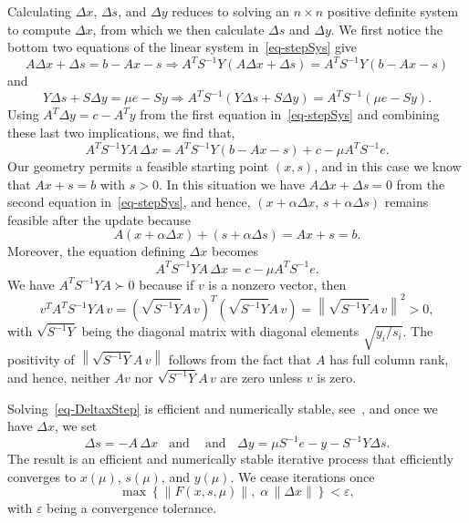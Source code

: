 \documentclass{article}
\def\pd{\succ}
\begin{document}
Calculating $\Delta x$, $\Delta s$, and $\Delta y$ reduces to solving
an $n \times n$ positive definite system to compute $\Delta x$, from
which we then calculate $\Delta s$ and $\Delta y$.
We first notice the bottom two equations of the linear 
system in~\eqref{eq-stepSys} give
\[
A \Delta x + \Delta s = b - Ax - s
   \Rightarrow A^TS^{-1}Y \left( A \Delta x + \Delta s \right)
                    = A^T S^{-1}Y \left( b - Ax - s \right)
\]
and
\[
Y \Delta s + S \Delta y = \mu e - Sy
   \Rightarrow A^TS^{-1} \left(Y \Delta s + S \Delta y \right)
                    = A^TS^{-1} \left( \mu e - Sy \right). 
\]
Using $A^T \Delta y = c - A^Ty$ from the first equation
in~\eqref{eq-stepSys} and combining these last two implications, we 
find that,
\[
A^T S^{-1}YA \, \Delta x = A^T S^{-1} Y \left( b - Ax - s \right)
    + c - \mu A^T S^{-1} e.
\]
Our geometry permits a feasible starting point $(x,s)$, and
in this case we know that $Ax + s = b$ with $s > 0$. In this situation
we have $A \Delta x + \Delta s = 0$ from the second equation 
in~\eqref{eq-stepSys}, and hence,
$(x + \alpha \Delta x, \, s + \alpha \Delta s)$ remains feasible
after the update because
\[
A (x + \alpha \Delta x) + (s + \alpha \Delta s)
    = Ax + s = b.
\]
Moreover, the equation defining $\Delta x$ becomes
\begin{equation} \label{eq-DeltaxStep}
A^T S^{-1}YA \, \Delta x = c - \mu A^T S^{-1} e.
\end{equation}
We have $A^T S^{-1} YA \pd 0$ because if $v$ is a nonzero vector, then
\[
v^T A^T S^{-1} YA \, v = (\sqrt{S^{-1}Y}A\,v)^T(\sqrt{S^{-1}Y}A\,v)
    = \left\| \sqrt{S^{-1}Y}A \, v \right\|^2 > 0,
\]
with $\sqrt{S^{-1}Y}$ being the diagonal matrix with diagonal elements 
$\sqrt{y_i / s_i}$. The positivity of $\left\| \sqrt{S^{-1}Y}A \, v \right\|$
follows from the fact that $A$ has full column rank, and hence, neither
$Av$ nor $\sqrt{S^{-1}Y}A \, v$ are zero unless $v$ is zero.

Solving~\eqref{eq-DeltaxStep} is efficient and numerically stable,
see~\cite{wright1994,wright1999}, and once we have $\Delta x$, we set
\[
\Delta s = -A \, \Delta x \;\; \mbox{ and } \;\; \mbox{ and } \;\;
\Delta y = \mu S^{-1} e - y - S^{-1} Y \Delta s.
\]
The result is an efficient and numerically stable iterative process
that efficiently converges to $x(\mu)$, $s(\mu)$, and $y(\mu)$. 
We cease iterations once
\begin{equation} \label{eq-tolPath}
\max \left\{ \| F(x,s,\mu) \|, \; \alpha \, \| \Delta x \| \right\}
    < \varepsilon, 
\end{equation}
with $\varepsilon$ being a convergence tolerance. 
\end{document}
